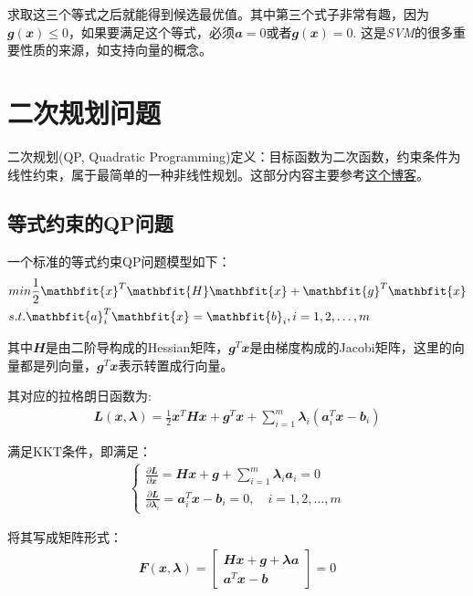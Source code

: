 求取这三个等式之后就能得到候选最优值。其中第三个式子非常有趣，因为$\mathbfit{g}(\mathbfit{x})\leq 0$，如果要满足这个等式，必须$\mathbfit{a}=0$或者$\mathbfit{g}(\mathbfit{x})= 0$. 这是\emph{SVM}的很多重要性质的来源，如支持向量的概念。


\section{二次规划问题}

二次规划(QP, Quadratic Programming)定义：目标函数为二次函数，约束条件为线性约束，属于最简单的一种非线性规划。这部分内容主要参考\href{https://zhuanlan.zhihu.com/p/375762164}{这个博客}。

\subsection{等式约束的QP问题}

一个标准的等式约束QP问题模型如下：
\begin{align}
  &min \quad \frac{1}{2}\mathbfit{x}^T\mathbfit{H}\mathbfit{x}+\mathbfit{g}^T\mathbfit{x} \notag\\
  &s.t. \quad \mathbfit{a}_i^T\mathbfit{x}=\mathbfit{b}_i, \quad i = 1, 2, \dots, m
\end{align}

其中$\mathbfit{H}$是由二阶导构成的Hessian矩阵，$\mathbfit{g}^T\mathbfit{x}$是由梯度构成的Jacobi矩阵，这里的向量都是列向量，$\mathbfit{g}^T\mathbfit{x}$表示转置成行向量。

其对应的拉格朗日函数为:
\begin{align}
  \mathbfit{L}(\mathbfit{x},\mathbfit{\lambda})=\frac{1}{2}\mathbfit{x}^T\mathbfit{H}\mathbfit{x}+\mathbfit{g}^T\mathbfit{x}+\sum_{i=1}^{m}\mathbfit{\lambda}_i(\mathbfit{a}_i^T\mathbfit{x}-\mathbfit{b}_i)
\end{align}

满足KKT条件，即满足：
\begin{align}
  \begin{cases}
    \frac{\partial \mathbfit{L}}{\partial \mathbfit{x}}=\mathbfit{H}\mathbfit{x}+\mathbfit{g}+\sum_{i=1}^{m}\mathbfit{\lambda}_i\mathbfit{a}_i=0\\
    \frac{\partial \mathbfit{L}}{\partial \mathbfit{\lambda}_i}=\mathbfit{a}_i^T\mathbfit{x}-\mathbfit{b}_i=0, \quad i = 1, 2, \dots, m
  \end{cases}
\end{align}

将其写成矩阵形式：
\begin{align}
  \mathbfit{F}(\mathbfit{x},\mathbfit{\lambda})=\begin{bmatrix}
    \mathbfit{H}\mathbfit{x}+\mathbfit{g}+\mathbfit{\lambda}\mathbfit{a}\\
    \mathbfit{a}^T\mathbfit{x}-\mathbfit{b}
  \end{bmatrix} = 0
\end{align}

